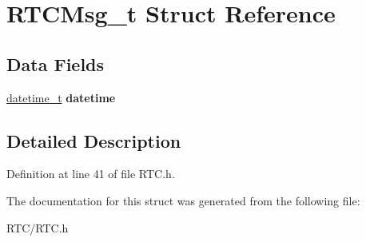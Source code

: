 \hypertarget{struct_r_t_c_msg__t}{}\section{R\+T\+C\+Msg\+\_\+t Struct Reference}
\label{struct_r_t_c_msg__t}
\subsection*{Data Fields}
\begin{DoxyCompactItemize}
\item 
\hypertarget{struct_r_t_c_msg__t_a617c441d8bac1647d326861e88a0735c}{}\hyperlink{structdatetime__t}{datetime\+\_\+t} {\bfseries datetime}\label{struct_r_t_c_msg__t_a617c441d8bac1647d326861e88a0735c}

\end{DoxyCompactItemize}


\subsection{Detailed Description}


Definition at line 41 of file R\+T\+C.\+h.



The documentation for this struct was generated from the following file\+:\begin{DoxyCompactItemize}
\item 
R\+T\+C/R\+T\+C.\+h\end{DoxyCompactItemize}
